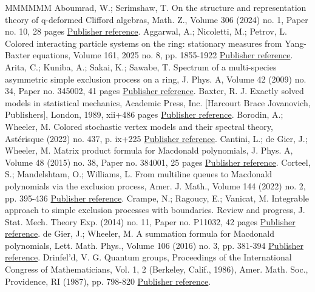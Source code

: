 \documentclass[11pt]{article}
\theoremstyle{definition}
\numberwithin{equation}{section}
\begin{document}
\begin{thebibliography}{MMMMMM}
 Aboumrad, W.; Scrimshaw, T. On the structure and representation theory of q-deformed Clifford algebras, Math. Z., Volume 306 (2024) no. 1, Paper no. 10, 28 pages \href{https://alco.centre-mersenne.org/articles/10.5802/alco.457/#AS24}{Publisher reference}.
 Aggarwal, A.; Nicoletti, M.; Petrov, L. Colored interacting particle systems on the ring: stationary measures from Yang-Baxter equations, Volume 161, 2025 no. 8, pp. 1855-1922 \href{https://alco.centre-mersenne.org/articles/10.5802/alco.457/#ANP}{Publisher reference}.
 Arita, C.; Kuniba, A.; Sakai, K.; Sawabe, T. Spectrum of a multi-species asymmetric simple exclusion process on a ring, J. Phys. A, Volume 42 (2009) no. 34, Paper no. 345002, 41 pages \href{https://alco.centre-mersenne.org/articles/10.5802/alco.457/#AKSS}{Publisher reference}.
 Baxter, R. J. Exactly solved models in statistical mechanics, Academic Press, Inc. [Harcourt Brace Jovanovich, Publishers], London, 1989, xii+486 pages \href{https://alco.centre-mersenne.org/articles/10.5802/alco.457/#Bax}{Publisher reference}.
 Borodin, A.; Wheeler, M. Colored stochastic vertex models and their spectral theory, Astérisque (2022) no. 437, p. ix+225 \href{https://alco.centre-mersenne.org/articles/10.5802/alco.457/#BW}{Publisher reference}.
 Cantini, L.; de Gier, J.; Wheeler, M. Matrix product formula for Macdonald polynomials, J. Phys. A, Volume 48 (2015) no. 38, Paper no. 384001, 25 pages \href{https://alco.centre-mersenne.org/articles/10.5802/alco.457/#CDW}{Publisher reference}.
 Corteel, S.; Mandelshtam, O.; Williams, L. From multiline queues to Macdonald polynomials via the exclusion process, Amer. J. Math., Volume 144 (2022) no. 2, pp. 395-436 \href{https://alco.centre-mersenne.org/articles/10.5802/alco.457/#CMW}{Publisher reference}.
 Crampe, N.; Ragoucy, E.; Vanicat, M. Integrable approach to simple exclusion processes with boundaries. Review and progress, J. Stat. Mech. Theory Exp. (2014) no. 11, Paper no. P11032, 42 pages \href{https://alco.centre-mersenne.org/articles/10.5802/alco.457/#CRV}{Publisher reference}.
 de Gier, J.; Wheeler, M. A summation formula for Macdonald polynomials, Lett. Math. Phys., Volume 106 (2016) no. 3, pp. 381-394 \href{https://alco.centre-mersenne.org/articles/10.5802/alco.457/#DW}{Publisher reference}.
 Drinfel’d, V. G. Quantum groups, Proceedings of the International Congress of Mathematicians, Vol. 1, 2 (Berkeley, Calif., 1986), Amer. Math. Soc., Providence, RI (1987), pp. 798-820 \href{https://alco.centre-mersenne.org/articles/10.5802/alco.457/#D86}{Publisher reference}.

\end{thebibliography}
\end{document}

